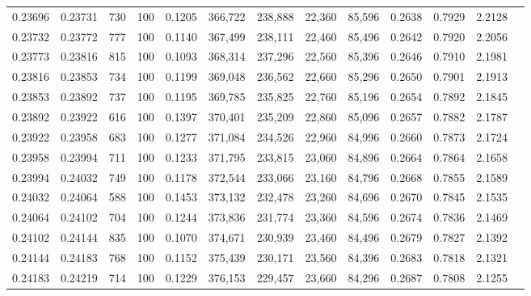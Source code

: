 \begin{tabular}{rrrrrrrrrrrrr}
0.23696 & 0.23731 &   730 & 100 &                                     0.1205 & 366,722 & 238,888 &  22,360 &  85,596 & 0.2638 & 0.7929 & 2.2128 \\
0.23732 & 0.23772 &   777 & 100 &                                     0.1140 & 367,499 & 238,111 &  22,460 &  85,496 & 0.2642 & 0.7920 & 2.2056 \\
0.23773 & 0.23816 &   815 & 100 &                                     0.1093 & 368,314 & 237,296 &  22,560 &  85,396 & 0.2646 & 0.7910 & 2.1981 \\
0.23816 & 0.23853 &   734 & 100 &                                     0.1199 & 369,048 & 236,562 &  22,660 &  85,296 & 0.2650 & 0.7901 & 2.1913 \\
0.23853 & 0.23892 &   737 & 100 &                                     0.1195 & 369,785 & 235,825 &  22,760 &  85,196 & 0.2654 & 0.7892 & 2.1845 \\
0.23892 & 0.23922 &   616 & 100 &                                     0.1397 & 370,401 & 235,209 &  22,860 &  85,096 & 0.2657 & 0.7882 & 2.1787 \\
0.23922 & 0.23958 &   683 & 100 &                                     0.1277 & 371,084 & 234,526 &  22,960 &  84,996 & 0.2660 & 0.7873 & 2.1724 \\
0.23958 & 0.23994 &   711 & 100 &                                     0.1233 & 371,795 & 233,815 &  23,060 &  84,896 & 0.2664 & 0.7864 & 2.1658 \\
0.23994 & 0.24032 &   749 & 100 &                                     0.1178 & 372,544 & 233,066 &  23,160 &  84,796 & 0.2668 & 0.7855 & 2.1589 \\
0.24032 & 0.24064 &   588 & 100 &                                     0.1453 & 373,132 & 232,478 &  23,260 &  84,696 & 0.2670 & 0.7845 & 2.1535 \\
0.24064 & 0.24102 &   704 & 100 &                                     0.1244 & 373,836 & 231,774 &  23,360 &  84,596 & 0.2674 & 0.7836 & 2.1469 \\
0.24102 & 0.24144 &   835 & 100 &                                     0.1070 & 374,671 & 230,939 &  23,460 &  84,496 & 0.2679 & 0.7827 & 2.1392 \\
0.24144 & 0.24183 &   768 & 100 &                                     0.1152 & 375,439 & 230,171 &  23,560 &  84,396 & 0.2683 & 0.7818 & 2.1321 \\
0.24183 & 0.24219 &   714 & 100 &                                     0.1229 & 376,153 & 229,457 &  23,660 &  84,296 & 0.2687 & 0.7808 & 2.1255 \\

\end{tabular}
